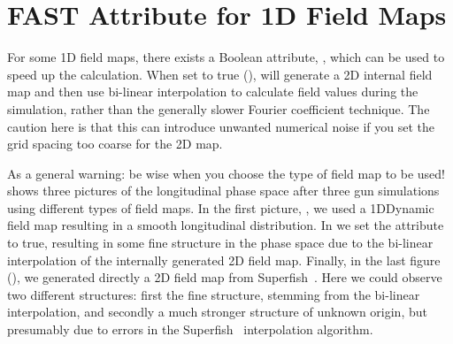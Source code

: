 \section{FAST Attribute for 1D Field Maps}
\label{sec:fastattribute}
For some 1D field maps, there exists a Boolean attribute, , which can be used to speed up the calculation. When set to true
(), \opalt will generate a 2D internal field map and then use bi-linear interpolation to calculate field values
during the simulation, rather than the generally slower Fourier coefficient technique. The caution here is that this can introduce
unwanted numerical noise if you set the grid spacing too coarse for the 2D map.

\leftpointright As a general warning: be wise when you choose the type of field map to be used!  shows
three pictures of the longitudinal phase space after three gun simulations using different types of field maps. In the first picture,
, we used a 1DDynamic field map  resulting in a smooth longitudinal
distribution. In  we set the  attribute to true, resulting in some fine structure
in the phase space due to the bi-linear interpolation of the internally generated 2D field map. Finally, in the last figure
(), we generated directly a 2D field map from  Superfish~\cite{superfish}. Here we could
observe two different structures: first the fine structure, stemming from the bi-linear interpolation, and secondly a much stronger
structure of unknown origin, but presumably due to errors in the Superfish~\cite{superfish} interpolation algorithm.

